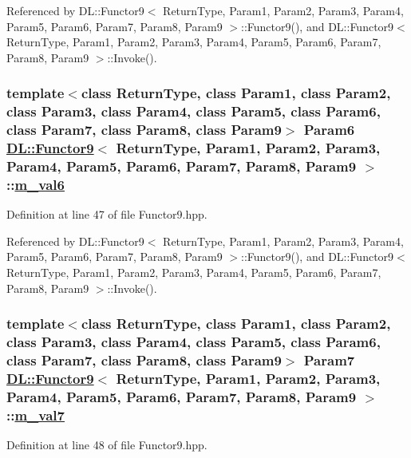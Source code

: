 Referenced by DL::Functor9$<$ Return\-Type, Param1, Param2, Param3, Param4, Param5, Param6, Param7, Param8, Param9 $>$::Functor9(), and DL::Functor9$<$ Return\-Type, Param1, Param2, Param3, Param4, Param5, Param6, Param7, Param8, Param9 $>$::Invoke().\hypertarget{classDL_1_1Functor9_r6}{
\subsubsection[m\_\-val6]{\setlength{\rightskip}{0pt plus 5cm}template$<$class Return\-Type, class Param1, class Param2, class Param3, class Param4, class Param5, class Param6, class Param7, class Param8, class Param9$>$ Param6 \hyperlink{classDL_1_1Functor9}{DL::Functor9}$<$ Return\-Type, Param1, Param2, Param3, Param4, Param5, Param6, Param7, Param8, Param9 $>$::\hyperlink{classDL_1_1Functor9_r6}{m\_\-val6}}}
\label{classDL_1_1Functor9_r6}




Definition at line 47 of file Functor9.hpp.

Referenced by DL::Functor9$<$ Return\-Type, Param1, Param2, Param3, Param4, Param5, Param6, Param7, Param8, Param9 $>$::Functor9(), and DL::Functor9$<$ Return\-Type, Param1, Param2, Param3, Param4, Param5, Param6, Param7, Param8, Param9 $>$::Invoke().\hypertarget{classDL_1_1Functor9_r7}{
\subsubsection[m\_\-val7]{\setlength{\rightskip}{0pt plus 5cm}template$<$class Return\-Type, class Param1, class Param2, class Param3, class Param4, class Param5, class Param6, class Param7, class Param8, class Param9$>$ Param7 \hyperlink{classDL_1_1Functor9}{DL::Functor9}$<$ Return\-Type, Param1, Param2, Param3, Param4, Param5, Param6, Param7, Param8, Param9 $>$::\hyperlink{classDL_1_1Functor9_r7}{m\_\-val7}}}
\label{classDL_1_1Functor9_r7}




Definition at line 48 of file Functor9.hpp.

